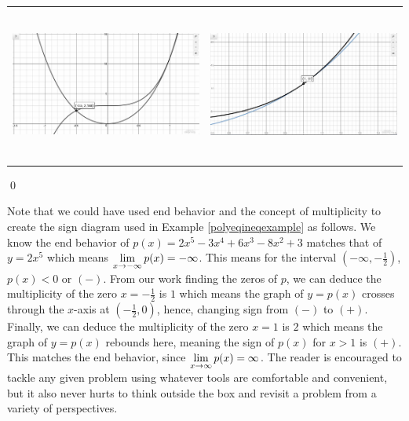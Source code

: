 \begin{ex}
\begin{enumerate}
\begin{center}
\begin{tabular}{cc}
\includegraphics[width = 3in, height=2in]{./RealZerosGraphics/RealZerosEx03a.jpg}  &\includegraphics[width = 3in, height=2in]{./RealZerosGraphics/RealZerosEx03b.jpg}

\end{tabular}
\end{center} 

\qed
\end{enumerate}

\end{ex}

Note that we could have used end behavior and the concept of multiplicity to create the sign diagram used in Example \ref{polyeqineqexample} as follows.  We know the end behavior of $p(x) = 2x^5-3x^4+6x^3-8x^2+3$ matches that of $y = 2x^5$ which means $\displaystyle{\lim_{x \rightarrow -\infty} p(x) = -\infty}$.  This means for the interval $\left(-\infty, -\frac{1}{2}\right)$, $p(x) < 0$ or $(-)$. From our work finding the zeros of $p$, we can deduce the multiplicity of the zero $x = -\frac{1}{2}$ is $1$ which means the graph of $y = p(x)$ crosses through the $x$-axis at $\left( -\frac{1}{2}, 0 \right)$, hence, changing sign from $(-)$ to $(+)$.  Finally, we can deduce the multiplicity of the zero $x = 1$ is $2$ which means the graph of $y = p(x)$ rebounds here, meaning the sign of $p(x)$ for $x > 1$ is $(+)$.  This matches the end behavior, since $\displaystyle{\lim_{x \rightarrow \infty} p(x) = \infty}$.  The reader is encouraged to tackle any given problem using whatever tools are comfortable and convenient, but it also never hurts to think outside the box and revisit a problem from a variety of perspectives.

